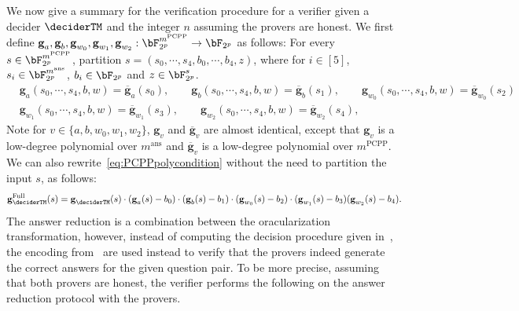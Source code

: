 We now give a summary for the verification procedure for a verifier given a decider $\deciderTM$ and the integer $n$ assuming the provers are honest. We first define $\textbf{g}_a, \textbf{g}_b,\textbf{g}_{w_0}, \textbf{g}_{w_1},\textbf{g}_{w_2}: \bF_{2^{p}}^{ m^{\text{PCPP}}} \rightarrow \bF_{2^{p}}$ as follows: For every $s \in \bF_{2^p}^{m^{\text{PCPP}}}$, partition $s =(s_0, \cdots, s_4, b_0, \cdots, b_4, z)$, where for $i \in [5]$, $s_i \in  \bF_{2^p}^{m^{\text{ans}}}$,  $b_i \in  \bF_{2^p}$ and $z \in  \bF_{2^p}^s$.
\begin{align}
	\nonumber &\textbf{g}_a(s_0, \cdots, s_4,b, w) = \overline{\textbf{g}}_a(s_0), \qquad \textbf{g}_{b}(s_0, \cdots, s_4,b, w) = \overline{\textbf{g}}_b(s_1), \qquad \textbf{g}_{w_0}(s_0, \cdots, s_4,b, w) = \overline{\textbf{g}}_{w_0}(s_2)\\
	&\textbf{g}_{w_1}(s_0, \cdots, s_4,b, w) = \overline{\textbf{g}}_{w_1}(s_3),\qquad \textbf{g}_{w_2}(s_0, \cdots, s_4,b, w) = \overline{\textbf{g}}_{w_2}(s_4), \label{eq:PCPpolypartition} 
\end{align}
Note for $v \in \{a,b,  w_0, w_1, w_2\}$, $\textbf{g}_v$ and $\overline{\textbf{g}}_v$ are almost identical, except that $\textbf{g}_v$ is a low-degree polynomial over $m^{\text{ans}}$ and $\overline{\textbf{g}}_v$ is a low-degree polynomial over $m^{\text{PCPP}}$. We can also rewrite~\eqref{eq:PCPPpolycondition} without the need to partition the input $s$, as follows: 
\begin{equation} \label{eq:PCPPpolyconditionalt}
	\textbf{g}_{\deciderTM}^{\text{Full}}(s) = \textbf{g}_{\deciderTM}(s) \cdot (\textbf{g}_a(s) - b_0) \cdot (\textbf{g}_b(s) - b_1)  \cdot (\textbf{g}_{w_0}(s) - b_2) \cdot (\textbf{g}_{w_1}(s) - b_3) (\textbf{g}_{w_2}(s) -  b_4). 
\end{equation}
The answer reduction is a combination between the oracularization transformation, however, instead of computing the decision procedure given in~, the encoding from~ are used instead to verify that the provers indeed generate the correct answers for the given question pair. To be more precise, assuming that both provers are honest, the verifier performs the following on the answer reduction protocol with the provers.


